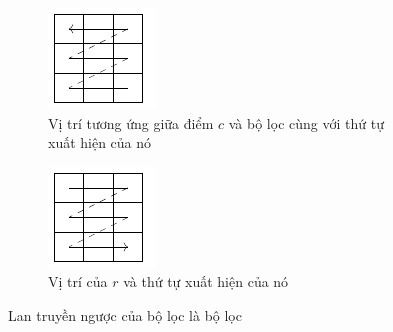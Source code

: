 \begin{figure}[htb]
\begin{subfigure}[t]{0.3\textwidth}
        \includegraphics[width=\textwidth]{tikz_image/cnn_back_propagation_filter_2.pdf}
        \caption{Vị trí tương ứng giữa điểm $c$ và bộ lọc cùng với thứ tự xuất hiện của nó}
        \label{figure:cnn-backpropagation-filter-2}
    \end{subfigure}\hspace{1em}
    \begin{subfigure}[t]{0.3\textwidth}
        \centering
        \includegraphics[width=\textwidth]{tikz_image/cnn_back_propagation_filter_3.pdf}
        \caption{Vị trí của $r$ và thứ tự xuất hiện của nó}
        \label{figure:cnn-backpropagation-filter-3}
    \end{subfigure}
    \caption{Lan truyền ngược của bộ lọc là bộ lọc}
    \label{figure:cnn-backpropagation-tensor}
\end{figure}
